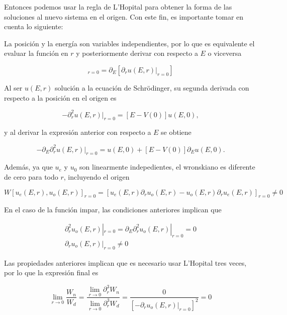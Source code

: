 Entonces podemos usar la regla de L'Hopital para obtener la forma de las soluciones al nuevo sistema en el origen. Con este fin, es  importante tomar en cuenta lo siguiente:

La posición y la energía son variables independientes, por lo que es equivalente el evaluar la función en $r$ y posteriormente derivar con respecto a $E$ o viceversa

\begin{equation*}
[\partial_E \partial_r u(E,r)]_{r=0} =  \partial_E [\partial_r u(E,r)|_{r=0}] 
\end{equation*}

Al ser $u(E,r)$ solución a la ecuación de Schrödinger, su segunda derivada con respecto a la posición en el origen es

\begin{equation}
-\partial^2_r u(E,r)|_{r=0} =  [E-V(0)]u(E,0) \label{ESIEO},
\end{equation}

y al derivar la expresión anterior con respecto a $E$ se obtiene

\begin{equation}
-\partial_E \partial^2_r u(E,r)|_{r=0} = u(E,0)+ [E-V(0)] \partial_E u(E ,0) \label{DEESIEO}.
\end{equation}

Además, ya que $u_e$ y $u_0$ son linearmente indepedientes, el wronskiano es diferente de cero para todo $r$, incluyendo el origen \cite{WronskianP}

\begin{equation}
W[u_e(E,r), u_o(E,r)]_{r=0} = [u_e(E,r)\partial_r u_o(E,r) - u_o(E,r)\partial_r u_e(E,r)]_{r=0} \ne 0 \label{PW1}
\end{equation}

En el caso de la función impar, las condiciones anteriores implican que

\begin{eqnarray*}
\partial^2_r u_o(E,r)|_{r=0} = \partial_E \partial^2_r u_o(E,r)|_{r=0} = 0
\\
\partial_r u_o(E,r)|_{r=0} \ne 0
\end{eqnarray*}

Las propiedades anteriores implican que es necesario usar L'Hopital tres veces, por lo que la expresión final es

\begin{equation*}
\lim_{r \to 0} \frac{W_n}{W_d} = \frac{\lim_{r \to 0} \partial^3_r W_n}{\lim_{r \to 0} \partial^3_r W_d} = \frac{0}{[-\partial_r u_o(E,r)|_{r=0}]^2} = 0
\end{equation*}

